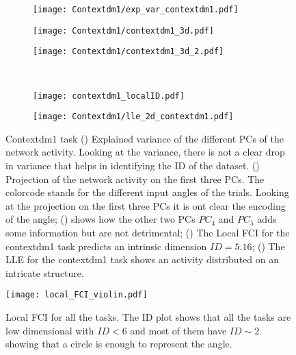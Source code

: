 \documentclass[11pt,a4paper]{article}
\begin{document}
\begin{figure}
 \centering
 \begin{subfigure}[b]{0.25\textwidth}
   \centering
   \texttt{[image: Contextdm1/exp\_var\_contextdm1.pdf]}
  \subcaption{}\label{fig:Contextdm1:exp_var_contextdm1}
 \end{subfigure}
 \begin{subfigure}[b]{0.30\textwidth}
   \centering
   \texttt{[image: Contextdm1/contextdm1\_3d.pdf]}
  \subcaption{}\label{fig:Contextdm1:contextdm1_3d}
 \end{subfigure}
 \begin{subfigure}[b]{0.40\textwidth}
   \centering
   \texttt{[image: Contextdm1/contextdm1\_3d\_2.pdf]}
  \subcaption{}\label{fig:Contextdm1:contextdm1_3d_2}
 \end{subfigure}\\
  \begin{subfigure}[b]{0.45\textwidth}
    \centering
    \texttt{[image: contextdm1\_localID.pdf]}
  \subcaption{}\label{fig:Contextdm1:hist2D_contextdm1_localFCI}
  \end{subfigure}
 \begin{subfigure}[b]{0.45\textwidth}
    \centering
    \texttt{[image: Contextdm1/lle\_2d\_contextdm1.pdf]}
  \subcaption{}\label{fig:Contextdm1:lle_2d_contextdm1}
  \end{subfigure}
 \caption{Contextdm1 task
() Explained variance of the different PCs of the network activity.
Looking at the variance, there is not a clear drop in variance that helps in identifying the ID of the dataset.
() Projection of the network activity on the first three PCs. The colorcode stands for the different input angles of the trials.
Looking at the projection on the first three PCs it is ont clear the encoding of the angle;
() shows how the other two PCs $PC_4$ and $PC_5$  adds some information but are not detrimental;
() The Local FCI for the contextdm1 task predicts an intrinsic dimension $ID=5.16$;
() The LLE for the contextdm1 task shows an activity distributed on an intricate structure.
 }\label{fig:Contextdm1}
\end{figure}



\begin{figure}
    \centering
    \texttt{[image: local\_FCI\_violin.pdf]}
    \caption{Local FCI for all the tasks.
    The ID plot shows that all the tasks are low dimensional with $ID<6$ and most of them have 
    $ID\sim 2$ showing that a circle is enough to represent the angle. 
    }\label{fig:local_FCI_alltasks}
\end{figure}
\end{document}
